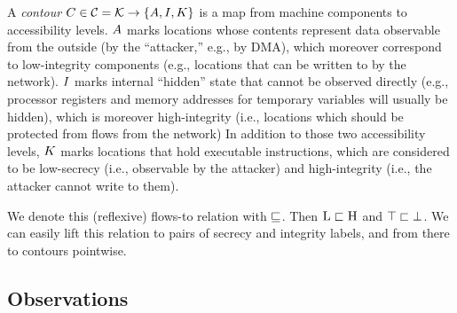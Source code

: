 \documentclass[conference]{IEEEtran}
\begin{document}
A {\em contour} $C \in {\mathcal C} = {\mathcal K} \rightarrow \{A,
I, K\}$ is a map from machine components to accessibility levels.
$A$ marks locations whose contents represent data observable from the
outside (by the ``attacker,'' e.g., by DMA), which moreover correspond to
low-integrity components (e.g., locations that can be written to \iftext
{} \fi by the network). $I$ marks internal
``hidden'' state that cannot be observed directly (e.g., processor registers and
memory addresses for temporary variables will usually be hidden), which is
moreover high-integrity (i.e., locations which should be protected from flows
from the network)
%
%
In addition to those two accessibility levels, $K$ marks locations that
hold executable instructions, which are considered to be low-secrecy (i.e.,
observable by the attacker) and high-integrity (i.e., the attacker cannot write
to them).


%
We denote this (reflexive) flows-to relation with $\sqsubseteq$. Then
$\textsc{L} \sqsubset \textsc{H}$ and $\top \sqsubset
\bot$. We can easily lift this relation to pairs of secrecy and
integrity labels, and from there to contours pointwise.

\subsection{Observations}
\end{document}
